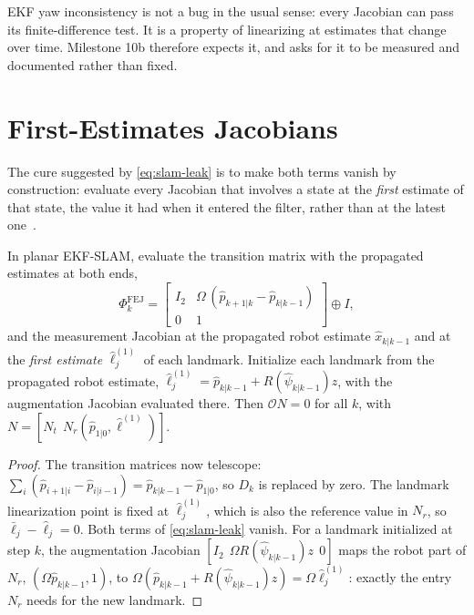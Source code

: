 \begin{keyidea}
EKF yaw inconsistency is not a bug in the usual sense: every Jacobian can pass its finite-difference test. It is a property of
linearizing at estimates that change over time. Milestone 10b therefore expects it, and asks for it to be measured and documented
rather than fixed.
\end{keyidea}

\section{First-Estimates Jacobians}
\label{sec:fej}

The cure suggested by \eqref{eq:slam-leak} is to make both terms vanish by construction: evaluate every Jacobian that involves a state at the
\emph{first} estimate of that state, the value it had when it entered the filter, rather than at the latest one~\cite{huang2008fej, huang2010observability}.

\begin{proposition}
\label{prop:fej}
In planar EKF-SLAM, evaluate the transition matrix with the propagated estimates at both ends,
\begin{equation}
  \Phi_k^{\mathrm{FEJ}} = \begin{bmatrix} I_2 & \Omega\,(\hat p_{k+1|k} - \hat p_{k|k-1}) \\ 0 & 1 \end{bmatrix} \oplus I,
\end{equation}
and the measurement Jacobian at the propagated robot estimate $\hat x_{k|k-1}$ and at the \emph{first estimate} $\hat\ell_j^{(1)}$ of each landmark. Initialize
each landmark from the propagated robot estimate, $\hat\ell_j^{(1)} = \hat p_{k|k-1} + R(\hat\psi_{k|k-1})z$, with the augmentation Jacobian evaluated there.
Then $\mathcal{O}N = 0$ for all $k$, with $N = [N_t\ \ N_r(\hat p_{1|0}, \hat\ell^{(1)})]$.
\end{proposition}
\begin{proof}
The transition matrices now telescope: $\sum_i(\hat p_{i+1|i} - \hat p_{i|i-1}) = \hat p_{k|k-1} - \hat p_{1|0}$, so $D_k$ is replaced by zero. The landmark linearization
point is fixed at $\hat\ell_j^{(1)}$, which is also the reference value in $N_r$, so $\bar\ell_j - \hat\ell_j = 0$. Both terms of \eqref{eq:slam-leak} vanish.
For a landmark initialized at step $k$, the augmentation Jacobian $[I_2\ \ \Omega R(\hat\psi_{k|k-1})z\ \ 0]$ maps the robot part of $N_r$, $(\Omega\hat p_{k|k-1}, 1)$, to
$\Omega(\hat p_{k|k-1} + R(\hat\psi_{k|k-1})z) = \Omega\hat\ell_j^{(1)}$: exactly the entry $N_r$ needs for the new landmark.
\end{proof}


